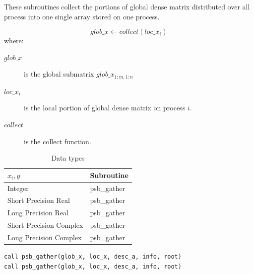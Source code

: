 These subroutines collect the portions of global dense matrix
distributed over all process into one single array stored on one
process.

\[ glob\_x \leftarrow collect(loc\_x_i) \]
where:
\begin{description}
\item[$glob\_x$] is the global submatrix $glob\_x_{1:m,1:n}$
\item[$loc\_x_i$] is the local portion of global dense matrix on
process $i$.
\item[$collect$] is the collect function.
\end{description}

\begin{table}[h]
\begin{center}
\begin{tabular}{ll}
\hline
$x_i, y$ & {\bf Subroutine}\\
\hline
Integer            & psb\_gather \\
Short Precision Real & psb\_gather \\
Long Precision Real & psb\_gather \\
Short Precision Complex & psb\_gather \\
Long Precision Complex & psb\_gather \\
\hline
\end{tabular}
\end{center}
\caption{Data types\label{tab:gather}}
\end{table}

\begin{lstlisting}
call psb_gather(glob_x, loc_x, desc_a, info, root)
call psb_gather(glob_x, loc_x, desc_a, info, root)
\end{lstlisting}

